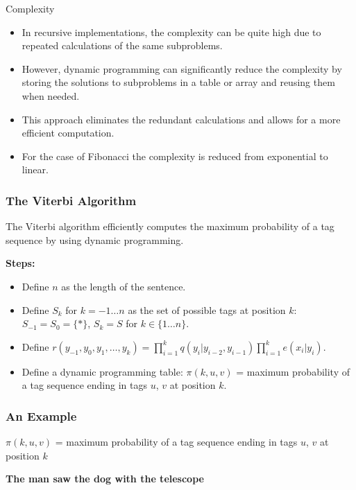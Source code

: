 \documentclass[handout]{beamer}
\begin{document}
\begin{frame}{Complexity}
\scriptsize

  \begin{itemize}
  
  \item In recursive implementations, the complexity can be quite high due to repeated calculations of the same subproblems. 
  \item However, dynamic programming can significantly reduce the complexity by storing the solutions to subproblems in a table or array and reusing them when needed. 
  \item This approach eliminates the redundant calculations and allows for a more efficient computation.
  \item For the case of Fibonacci the complexity is reduced from exponential to linear. 
  \end{itemize}

\end{frame}



\begin{frame}
  \frametitle{The Viterbi Algorithm}
  The Viterbi algorithm efficiently computes the maximum probability of a tag sequence by using dynamic programming.

  \textbf{Steps:}
  \begin{itemize}
    \item Define $n$ as the length of the sentence.
    \item Define $S_k$ for $k = -1 \ldots n$ as the set of possible tags at position $k$: $S_{-1} = S_0 = \{*\}$, $S_k = S$ for $k \in \{1 \ldots n\}$.
    \item Define $r(y_{-1}, y_0, y_1, \ldots, y_k) = \prod_{i=1}^k q(y_i|y_{i-2}, y_{i-1}) \prod_{i=1}^k e(x_i|y_i)$.
    \item Define a dynamic programming table: $\pi(k, u, v)$ = maximum probability of a tag sequence ending in tags $u$, $v$ at position $k$.
  \end{itemize}
\end{frame}

\begin{frame}
  \frametitle{An Example}
  $\pi(k, u, v)$ = maximum probability of a tag sequence ending in tags $u$, $v$ at position $k$

  \textbf{The man saw the dog with the telescope}




\end{frame}
\end{document}
